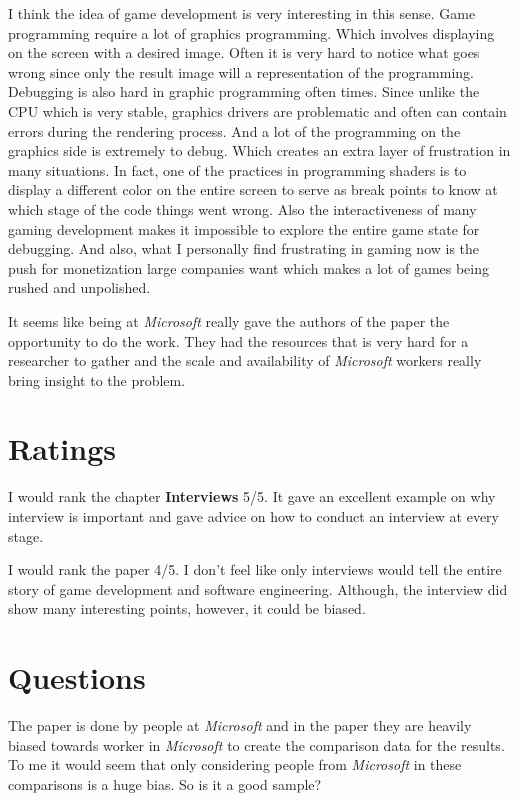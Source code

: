\documentclass[sigconf]{acmart}
\begin{document}
I think the idea of game development is very interesting in this sense. Game programming require a lot of graphics programming. Which involves displaying on the screen with a desired image. Often it is very hard to notice what goes wrong since only the result image will a representation of the programming. Debugging is also hard in graphic programming often times. Since unlike the CPU which is very stable, graphics drivers are problematic and often can contain errors during the rendering process. And a lot of the programming on the graphics side is extremely to debug. Which creates an extra layer of frustration in many situations. In fact, one of the practices in programming shaders is to display a different color on the entire screen to serve as break points to know at which stage of the code things went wrong. Also the interactiveness of many gaming development makes it impossible to explore the entire game state for debugging. And also, what I personally find frustrating in gaming now is the push for monetization large companies want which makes a lot of games being rushed and unpolished.

It seems like being at {\it Microsoft} really gave the authors of the paper the opportunity to do the work. They had the resources that is very hard for a researcher to gather and the scale and availability of {\it Microsoft} workers really bring insight to the problem. 


\section{Ratings}
I would rank the chapter {\bf Interviews} 5/5. It gave an excellent example on why interview is important and gave advice on how to conduct an interview at every stage.

I would rank the paper 4/5. I don't feel like only interviews would tell the entire story of game development and software engineering. Although, the interview did show many interesting points, however, it could be biased.

\section{Questions}
The paper is done by people at {\it Microsoft} and in the paper they are heavily biased towards worker in {\it Microsoft} to create the comparison data for the results. To me it would seem that only considering people from {\it Microsoft} in these comparisons is a huge bias. So is it a good sample?
\end{document}
